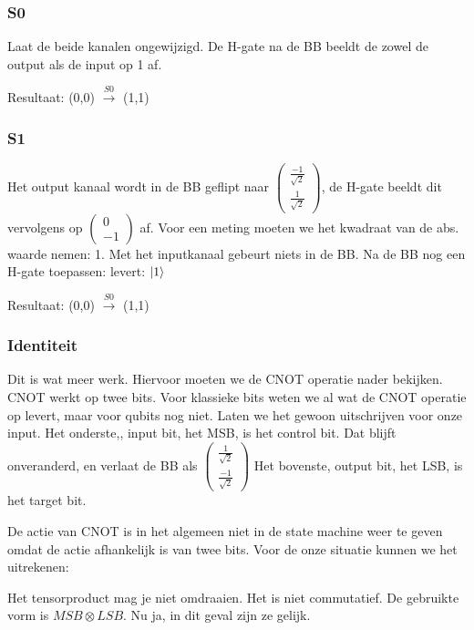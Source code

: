 \documentclass[../../main.tex]{subfiles}
\begin{document}
\subsubsection*{S0}
Laat de beide kanalen ongewijzigd. De H-gate na de BB beeldt de zowel de output als de input op 1 af.

Resultaat: (0,0) $\overset{S0}{\rightarrow}$ (1,1)

\subsubsection*{S1}
Het output kanaal wordt in de BB geflipt naar $
\begin{pmatrix} \tfrac{-1}{\sqrt{2}}  \\ \tfrac{1}{\sqrt{2}} \end{pmatrix}$, de H-gate beeldt dit vervolgens op $
\begin{pmatrix} 0 \\ -1 \end{pmatrix}$ af. Voor een meting moeten we het kwadraat van de abs. waarde nemen: 1.
Met het inputkanaal gebeurt niets in de BB. Na de BB nog een H-gate toepassen: levert: $\ket{1}$

Resultaat: (0,0) $\overset{S0}{\rightarrow}$ (1,1)

\subsubsection*{Identiteit} 
Dit is wat meer werk. Hiervoor moeten we de CNOT operatie nader bekijken. CNOT werkt op twee bits. Voor klassieke bits weten we al wat de CNOT operatie op levert, maar voor qubits nog niet. Laten we het gewoon uitschrijven voor onze input. 
Het onderste,, input bit, het MSB,  is het control bit. Dat blijft onveranderd, en verlaat de BB als 
$
\begin{pmatrix} \tfrac{1}{\sqrt{2}}  \\ \tfrac{-1}{\sqrt{2}} \end{pmatrix}$
Het bovenste, output bit, het LSB,  is het target bit.

De actie van CNOT is in het algemeen niet in de state machine weer te geven omdat de actie afhankelijk is van twee bits. Voor de onze situatie kunnen we het uitrekenen:

Het tensorproduct mag je niet omdraaien. Het is niet commutatief. De gebruikte vorm is $MSB \otimes LSB$. Nu ja, in dit geval zijn ze gelijk.
\end{document}
